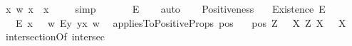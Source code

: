 \begin{isabellebody}
\isanewline
{}\isamarkupfalse%
\ {\isachardoublequoteopen}{\isasymlfloor}{\isacharparenleft}{\isasymlambda}x\ w{\isachardot}\ x\ {\isasymnoteq}\ x{\isacharparenright}\ {\isasymRrightarrow}\ {\isasymchi}{\isasymrfloor}{\isachardoublequoteclose}%
\ %
%
\isamarkupfalse%
\ simp%
%
%
\ \isanewline
{}\isamarkupfalse%
\ {\isachardoublequoteopen}{\isasymlfloor}\isactrlbold {\isasymnot}{\isacharparenleft}{\isasymphi}\ {\isasymRrightarrow}\ {\isasymchi}{\isacharparenright}\ \isactrlbold {\isasymrightarrow}\ \isactrlbold {\isasymdiamond}\isactrlbold {\isasymexists}\isactrlsup E\ {\isasymphi}{\isasymrfloor}{\isachardoublequoteclose}%
\ %
%
\isamarkupfalse%
\ auto%
%
%
\ \ \isanewline
\isanewline
{}\isamarkupfalse%
\ Positiveness{\isacharcolon}{\isacharcolon}{\isachardoublequoteopen}{\isasymup}{\isasymlangle}{\isasymup}{\isasymlangle}{\isasymzero}{\isasymrangle}{\isasymrangle}{\isachardoublequoteclose}\ {\isacharparenleft}{\isachardoublequoteopen}{\isasymP}{\isachardoublequoteclose}{\isacharparenright}\ %
\isanewline
{}\isamarkupfalse%
\ Existence{\isacharcolon}{\isacharcolon}{\isachardoublequoteopen}{\isasymup}{\isasymlangle}{\isasymzero}{\isasymrangle}{\isachardoublequoteclose}\ {\isacharparenleft}{\isachardoublequoteopen}E{\isacharbang}{\isachardoublequoteclose}{\isacharparenright}\ %
\ \isanewline
\ \ \ {\isachardoublequoteopen}E{\isacharbang}\ x\ \ {\isasymequiv}\ {\isasymlambda}w{\isachardot}\ {\isacharparenleft}\isactrlbold {\isasymexists}\isactrlsup Ey{\isachardot}\ y\isactrlbold {\isasymapprox}x{\isacharparenright}\ w{\isachardoublequoteclose}\ \isanewline
{}\isamarkupfalse%
\ appliesToPositiveProps{\isacharcolon}{\isacharcolon}{\isachardoublequoteopen}{\isasymup}{\isasymlangle}{\isasymup}{\isasymlangle}{\isasymup}{\isasymlangle}{\isasymzero}{\isasymrangle}{\isasymrangle}{\isasymrangle}{\isachardoublequoteclose}\ {\isacharparenleft}{\isachardoublequoteopen}pos{\isachardoublequoteclose}{\isacharparenright}\ \isanewline
\ \ {\isachardoublequoteopen}pos\ Z\ {\isasymequiv}\ \ \isactrlbold {\isasymforall}X{\isachardot}\ Z\ X\ \isactrlbold {\isasymrightarrow}\ {\isasymP}\ X{\isachardoublequoteclose}\ \ \isanewline
{}\isamarkupfalse%
\ intersectionOf{\isacharcolon}{\isacharcolon}{\isachardoublequoteopen}{\isasymup}{\isasymlangle}{\isasymup}{\isasymlangle}{\isasymzero}{\isasymrangle}{\isacharcomma}{\isasymup}{\isasymlangle}{\isasymup}{\isasymlangle}{\isasymzero}{\isasymrangle}{\isasymrangle}{\isasymrangle}{\isachardoublequoteclose}\ {\isacharparenleft}{\isachardoublequoteopen}intersec{\isachardoublequoteclose}{\isacharparenright}\ \isanewline

\end{isabellebody}
